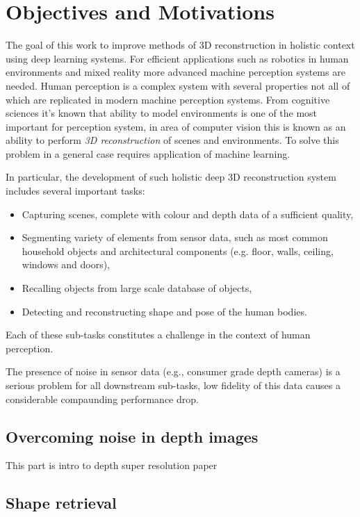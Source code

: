 \section{Objectives and Motivations}

The goal of this work to improve methods of 3D reconstruction in holistic context using deep learning systems. For efficient applications such as robotics in human environments and mixed reality more advanced machine perception systems are needed. Human perception is a complex system with several properties not all of which are replicated in modern machine perception systems. From cognitive sciences it's known that ability to model environments is one of the most important for perception system, in area of computer vision this is known as an ability to perform \textit{3D reconstruction} of scenes and environments. To solve this problem in a general case requires application of machine learning.

In particular, the development of such holistic deep 3D reconstruction system includes several important tasks:

\begin{itemize}
	\item Capturing scenes, complete with colour and depth data of a sufficient quality,
    \item Segmenting variety of elements from sensor data, such as most common household objects and architectural components (e.g. floor, walls, ceiling, windows and doors),
    \item Recalling objects from large scale database of objects,
    \item Detecting and reconstructing shape and pose of the human bodies.
\end{itemize}

Each of these sub-tasks constitutes a challenge in the context of human perception.

The presence of noise in sensor data (e.g., consumer grade depth cameras) is a serious problem for all downstream sub-tasks, low fidelity of this data causes a considerable compaunding performance drop.

\subsection{Overcoming noise in depth images}

This part is intro to depth super resolution paper

\subsection{Shape retrieval}

